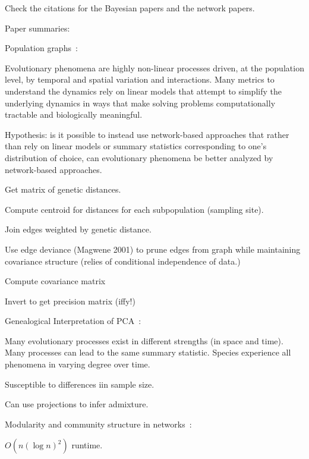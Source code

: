 \documentclass[10pt]{article}
\begin{document}
Check the citations for the Bayesian papers and the network papers.


Paper summaries:

Population graphs~\cite{dyer_population_2004}:

Evolutionary phenomena are highly non-linear processes driven, at the
population level, by temporal and spatial variation and interactions. Many
metrics to understand the dynamics rely on linear models that attempt to
simplify the underlying dynamics in ways that make solving problems
computationally tractable and biologically meaningful.

Hypothesis: is it possible to instead use network-based approaches that rather
than rely on linear models or summary statistics corresponding to one's
distribution of choice, can evolutionary phenomena be better analyzed by
network-based approaches.

Get matrix of genetic distances.

Compute centroid for distances for each subpopulation (sampling site).

Join edges weighted by genetic distance.

Use edge deviance (Magwene 2001) to prune edges from graph while maintaining
covariance structure (relies of conditional independence of data.)

Compute covariance matrix

Invert to get precision matrix (iffy!)


Genealogical Interpretation of PCA~\cite{mcvean_genealogical_2009}:

Many evolutionary processes exist in different strengths (in space and time).
Many processes can lead to the same summary statistic. Species experience all
phenomena in varying degree over time.

Susceptible to differences iin sample size.

Can use projections to infer admixture.


Modularity and community structure in networks~\cite{newman_modularity_2006}:

$O(n {(\log{n})}^2)$ runtime.







\end{document}
